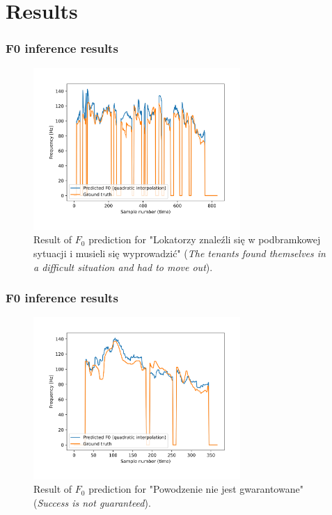 \documentclass[a4paper,9pt]{beamer}
\theoremstyle{mytheoremstyle}
\begin{document}
\section{Results}

\begin{frame}
\frametitle{F0 inference results}
\begin{figure}
\begin{center}
  \includegraphics[width=0.7\textwidth]{res/amu_pl_ilo_BAZA_2006A_zbitki_A0025_simple_pred_freq}
\end{center}
	\caption{Result of $F_0$ prediction for "Lokatorzy znale\'zli si\k{e} w podbramkowej sytuacji i musieli si\k{e} wyprowadzi\'c" (\textit{The tenants found themselves in a difficult situation and had to move out}).}
\end{figure}
\end{frame}

\begin{frame}
\frametitle{F0 inference results}
\begin{figure}
\begin{center}
  \includegraphics[width=0.7\textwidth]{res/amu_pl_ilo_BAZA_2006C_C0545_simple_pred_freq}
\end{center}
	\caption{Result of $F_0$ prediction for "Powodzenie nie jest gwarantowane" (\textit{Success is not guaranteed}).}
\end{figure}
\end{frame}
\end{document}

